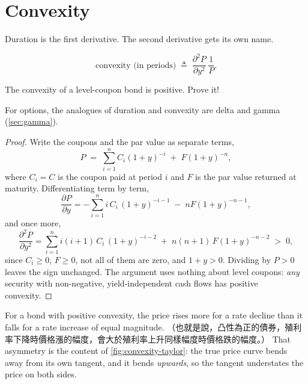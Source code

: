 \section{Convexity}
\label{sec:convexity}


Duration is the first derivative. The second derivative gets its own name.

\begin{definition}[Convexity]
	\begin{equation}
		\text{convexity (in periods)} \;\triangleq\; \frac{\partial^{2}P}{\partial y^{2}}\,\frac{1}{P}. \label{eq:convexity}
	\end{equation}
\end{definition}

\begin{exercise}
	The convexity of a level-coupon bond is positive. Prove it!
\end{exercise}

\suppstart
For options, the analogues of duration and convexity are delta and gamma (\autoref{sec:gamma}).

\begin{proof}
	Write the coupons and the par value as separate terms,
	\[
		P \;=\; \sum_{i=1}^{n}C_{i}(1+y)^{-i} \;+\; F(1+y)^{-n},
	\]
	where $C_{i}=C$ is the coupon paid at period $i$ and $F$ is the par value returned at maturity.
	Differentiating term by term,
	\[
		\frac{\partial P}{\partial y}
		= -\sum_{i=1}^{n} i\,C_{i}\,(1+y)^{-i-1} \;-\; nF(1+y)^{-n-1},
	\]
	and once more,
	\[
		\frac{\partial^{2}P}{\partial y^{2}}
		= \sum_{i=1}^{n} i(i+1)\,C_{i}\,(1+y)^{-i-2} \;+\; n(n+1)\,F(1+y)^{-n-2} \;>\; 0 ,
	\]
	since $C_{i}\ge 0$, $F\ge 0$, not all of them are zero, and $1+y>0$.
	Dividing by $P>0$ leaves the sign unchanged.
	The argument uses nothing about level coupons: \emph{any} security with non-negative, yield-independent cash flows has positive convexity.
\end{proof}
\suppend

For a bond with positive convexity, the price rises more for a rate decline than it falls for a rate increase of equal magnitude.
（也就是說，凸性為正的債券，殖利率下降時價格漲的幅度，會大於殖利率上升同樣幅度時價格跌的幅度。）
That asymmetry is the content of \autoref{fig:convexity-taylor}: the true price curve bends away from its own tangent, and it bends \emph{upwards}, so the tangent understates the price on both sides.

